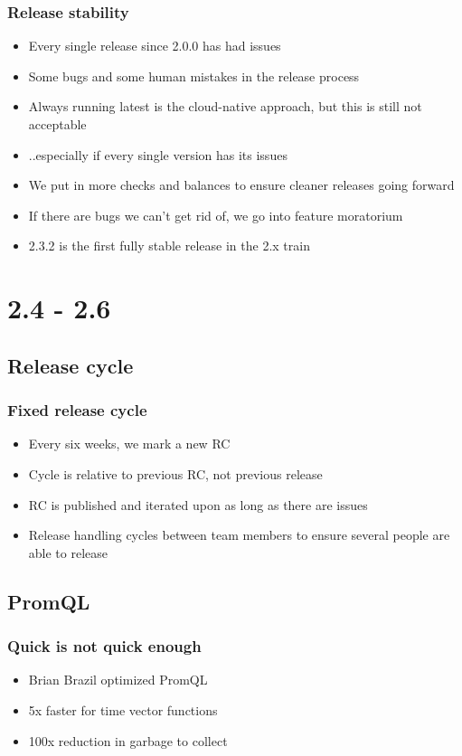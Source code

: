 \documentclass[aspectratio=169]{beamer}
\begin{document}
\begin{frame}
	\frametitle{Release stability}
	\begin{itemize}
		\item Every single release since 2.0.0 has had issues
		\item Some bugs and some human mistakes in the release process
		\item Always running latest is the cloud-native approach, but this is still not acceptable
		\item ..especially if every single version has its issues
		\item We put in more checks and balances to ensure cleaner releases going forward
		\item If there are bugs we can't get rid of, we go into feature moratorium
		\item 2.3.2 is the first fully stable release in the 2.x train
	\end{itemize}
\end{frame}


\section{2.4 - 2.6}


\subsection{Release cycle}

\begin{frame}
	\frametitle{Fixed release cycle}
	\begin{itemize}
		\item Every six weeks, we mark a new RC
		\item Cycle is relative to previous RC, not previous release
		\item RC is published and iterated upon as long as there are issues
		\item Release handling cycles between team members to ensure several people are able to release
	\end{itemize}
\end{frame}


\subsection{PromQL}

\begin{frame}
	\frametitle{Quick is not quick enough}
	\begin{itemize}
		\item Brian Brazil optimized PromQL
		\item 5x faster for time vector functions
		\item 100x reduction in garbage to collect
	\end{itemize}
\end{frame}
\end{document}
